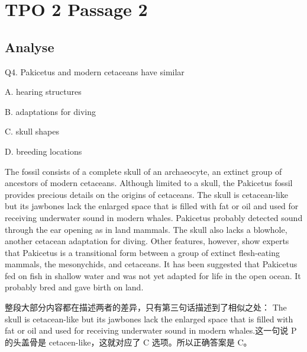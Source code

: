 \section{TPO 2 Passage 2}

\subsection{Analyse}

\begin{blk}
    \begin{qst}
        Q4. Pakicetus and modern cetaceans have similar
    \end{qst}

    \begin{chc}
        A. hearing structures

        B. adaptations for diving

        C. skull shapes

        D. breeding locations
    \end{chc}

    \begin{psgq}
        The fossil consists of a complete skull of an archaeocyte, an extinct group of ancestors of modern cetaceans. Although limited to a skull, the Pakicetus fossil provides precious details on the origins of cetaceans. The skull is cetacean-like but its jawbones lack the enlarged space that is filled with fat or oil and used for receiving underwater sound in modern whales. Pakicetus probably detected sound through the ear opening as in land mammals. The skull also lacks a blowhole, another cetacean adaptation for diving. Other features, however, show experts that Pakicetus is a transitional form between a group of extinct flesh-eating mammals, the mesonychids, and cetaceans. It has been suggested that Pakicetus fed on fish in shallow water and was not yet adapted for life in the open ocean. It probably bred and gave birth on land.
    \end{psgq}

    \begin{nlz}
        整段大部分内容都在描述两者的差异，只有第三句话描述到了相似之处： The skull is cetacean-like but its jawbones lack the enlarged space that is filled with fat or oil and used for receiving underwater sound in modern whales.这一句说 P 的头盖骨是 cetacen-like，这就对应了 C 选项。所以正确答案是 C。
    \end{nlz}
\end{blk}

